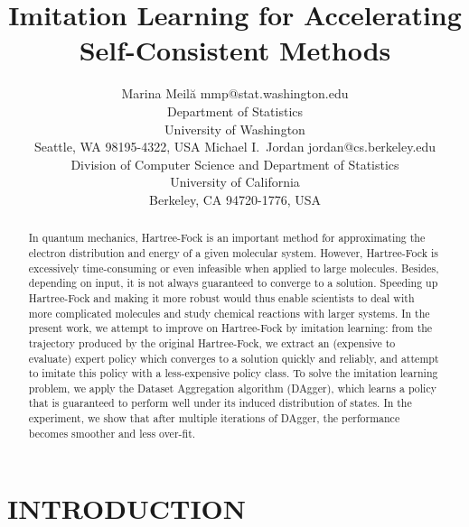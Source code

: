 \documentclass[twoside,11pt]{article}
\begin{document}
\title{Imitation Learning for Accelerating Self-Consistent Methods}

\author{\name Marina Meil\u{a} \email mmp@stat.washington.edu \\
       \addr Department of Statistics\\
       University of Washington\\
       Seattle, WA 98195-4322, USA
       \AND
       \name Michael I.\ Jordan \email jordan@cs.berkeley.edu \\
       \addr Division of Computer Science and Department of Statistics\\
       University of California\\
       Berkeley, CA 94720-1776, USA}


\maketitle


\begin{abstract}
In quantum mechanics, Hartree-Fock is an important method for approximating the electron distribution and energy of a given molecular system. However, Hartree-Fock is excessively time-consuming or even infeasible when applied to large molecules. Besides, depending on input, it is not always guaranteed to converge to a solution. Speeding up Hartree-Fock and making it more robust would thus enable scientists to deal with more complicated molecules and study chemical reactions with larger systems. In the present work, we attempt to improve on Hartree-Fock by imitation learning: from the trajectory produced by the original Hartree-Fock, we extract an (expensive to evaluate) expert policy which converges to a solution quickly and reliably, and attempt to imitate this policy with a less-expensive policy class.  To solve the imitation learning problem, we apply the Dataset Aggregation algorithm (DAgger), which learns a policy that is guaranteed to perform well under its induced distribution of states. In the experiment, we show that after 
 multiple iterations of DAgger, the performance becomes smoother and less over-fit. 
\end{abstract}

\section{INTRODUCTION}
\end{document}
